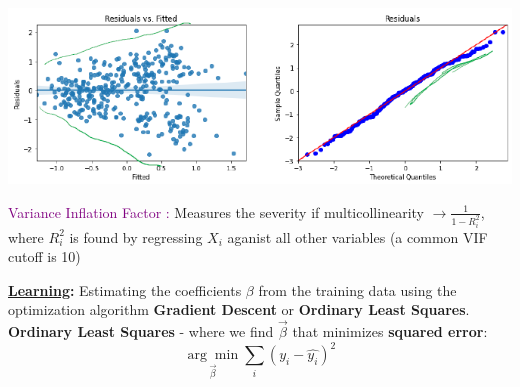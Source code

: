 \documentclass[letterpaper, 10.5pt,landscape]{article}
\begin{document}
\begin{multicols*}{3}
\begin{minipage}{\linewidth}
    \centering
    \includegraphics[width=\textwidth]{figures/Violation_EqualVariance_and_NormalErros.PNG}
\end{minipage}





\vspace{3pt}
\textcolor{purple}{Variance Inflation Factor :} Measures the severity if multicollinearity $\rightarrow \boxed{\frac{1}{1-R_{i}^{2}}}$, where $R_{i}^{2}$ is found by regressing $X_{i}$ aganist all other variables (a common VIF cutoff is 10)


\vspace{2pt}

\textbf{\underline{Learning}:} Estimating the coefficients $\beta$ from the training data using the optimization algorithm
\textbf{Gradient Descent} or \textbf{Ordinary Least Squares}. \\
\textbf{Ordinary Least Squares} - where we find $\Vec{\beta}$ that minimizes \textbf{squared error}:
\vspace{-5pt}
\[\boxed{\underset{\vec{\beta}} {\arg\min} \sum_{i} \left(y_{i} - \hat{y_{i}}  \right)^2} \]

\vspace{-15pt}


\end{multicols*}
\end{document}
